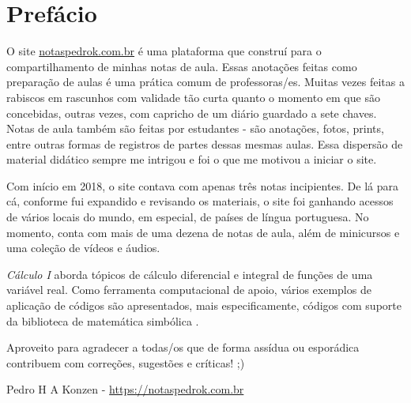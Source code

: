 

\chapter*{Prefácio}\label{prefacio}

O site \href{https://www.notaspedrok.com.br}{notaspedrok.com.br} é uma plataforma que construí para o compartilhamento de minhas notas de aula. Essas anotações feitas como preparação de aulas é uma prática comum de professoras/es. Muitas vezes feitas a rabiscos em rascunhos com validade tão curta quanto o momento em que são concebidas, outras vezes, com capricho de um diário guardado a sete chaves. Notas de aula também são feitas por estudantes - são anotações, fotos, prints, entre outras formas de registros de partes dessas mesmas aulas. Essa dispersão de material didático sempre me intrigou e foi o que me motivou a iniciar o site.

Com início em 2018, o site contava com apenas três notas incipientes. De lá para cá, conforme fui expandido e revisando os materiais, o site foi ganhando acessos de vários locais do mundo, em especial, de países de língua portuguesa. No momento, conta com mais de uma dezena de notas de aula, além de minicursos e uma coleção de vídeos e áudios.

\emph{Cálculo I} aborda tópicos de cálculo diferencial e integral de funções de uma variável real. Como ferramenta computacional de apoio, vários exemplos de aplicação de códigos {\python} são apresentados, mais especificamente, códigos com suporte da biblioteca de matemática simbólica {\sympy}.

Aproveito para agradecer a todas/os que de forma assídua ou esporádica contribuem com correções, sugestões e críticas! ;)

\begin{flushright}
  Pedro H A Konzen - \url{https://notaspedrok.com.br}
\end{flushright}

